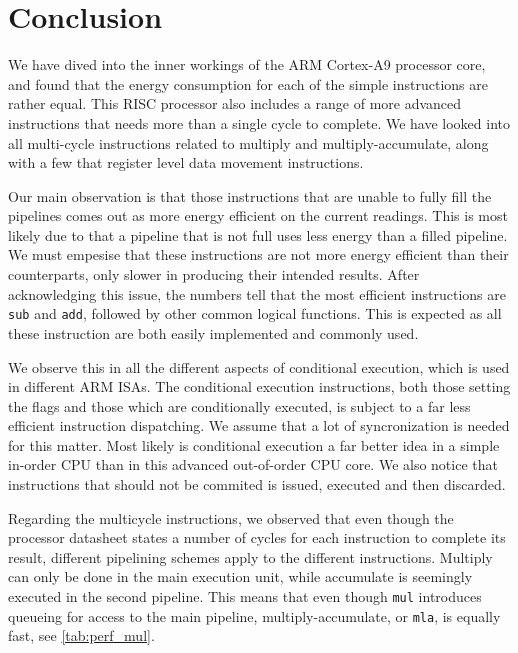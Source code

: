 \section{Conclusion}
We have dived into the inner workings of the ARM Cortex-A9 processor core, and
found that the energy consumption for each of the simple instructions are rather
equal. This RISC processor also includes a range of more advanced instructions
that needs more than a single cycle to complete. We have looked into all
multi-cycle instructions related to multiply and multiply-accumulate, along with
a few that register level data movement instructions.

Our main observation is that those instructions that are unable to fully fill
the pipelines comes out as more energy efficient on the current readings. This
is most likely due to that a pipeline that is not full uses less energy than a
filled pipeline. We must empesise that these instructions are not more energy
efficient than their counterparts, only slower in producing their intended
results.  After acknowledging this issue, the numbers tell that the most
efficient instructions are \texttt{sub} and \texttt{add}, followed by other
common logical functions. This is expected as all these instruction are both
easily implemented and commonly used.

We observe this in all the different aspects of conditional
execution, which is used in different ARM ISAs. The conditional execution
instructions, both those setting the flags and those which are conditionally
executed, is subject to a far less efficient instruction dispatching. We assume
that a lot of syncronization is needed for this matter. Most likely is
conditional execution a far better idea in a simple in-order CPU than in this
advanced out-of-order CPU core. We also notice that instructions that should not
be commited is issued, executed and then discarded.

Regarding the multicycle instructions, we observed that even though the processor
datasheet\cite{armtech} states a number of cycles for each instruction to complete
its result, different pipelining schemes apply to the different instructions. Multiply
can only be done in the main execution unit, while accumulate is seemingly executed in
the second pipeline. This means that even though \texttt{mul} introduces queueing for access
to the main pipeline, multiply-accumulate, or \texttt{mla}, is equally fast, see \autoref{tab:perf_mul}.

\vfill

